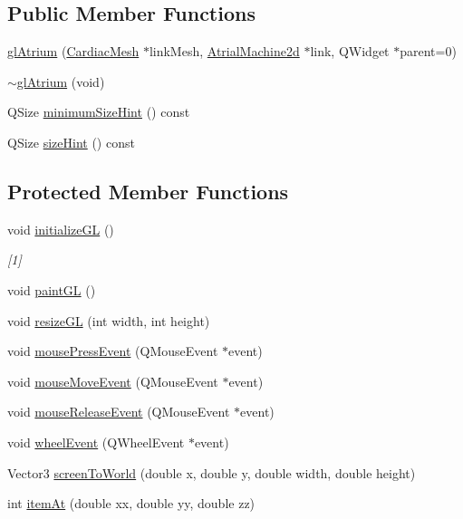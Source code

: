 \subsection*{Public Member Functions}
\begin{DoxyCompactItemize}
\item 
\hyperlink{classgl_atrium_a68d308b0209b6111bbbcbb56b1a5e10c}{gl\+Atrium} (\hyperlink{class_cardiac_mesh}{Cardiac\+Mesh} $\ast$link\+Mesh, \hyperlink{class_atrial_machine2d}{Atrial\+Machine2d} $\ast$link, Q\+Widget $\ast$parent=0)
\item 
\hyperlink{classgl_atrium_aab01fe62e0f7734e3b91b42a11d32db7}{$\sim$gl\+Atrium} (void)
\item 
Q\+Size \hyperlink{classgl_atrium_acf3a401dfd3ca09d8dcb36886f306ba9}{minimum\+Size\+Hint} () const 
\item 
Q\+Size \hyperlink{classgl_atrium_a0e7fc813e7c9ae4d47317109815b9705}{size\+Hint} () const 
\end{DoxyCompactItemize}
\subsection*{Protected Member Functions}
\begin{DoxyCompactItemize}
\item 
void \hyperlink{classgl_atrium_a6fc7ea9064a492b562c0858eb3c44f86}{initialize\+G\+L} ()
\begin{DoxyCompactList}\small\item\em \mbox{[}1\mbox{]} \end{DoxyCompactList}\item 
void \hyperlink{classgl_atrium_a951d4caaef073f6762ddd47a409d2cf6}{paint\+G\+L} ()
\item 
void \hyperlink{classgl_atrium_a40cd7c018c743e5738560fdb4e4fea59}{resize\+G\+L} (int width, int height)
\item 
void \hyperlink{classgl_atrium_af0e47f4d5e0bc6d8cdcf16dd23c0487b}{mouse\+Press\+Event} (Q\+Mouse\+Event $\ast$event)
\item 
void \hyperlink{classgl_atrium_ad5af63d41d959d40d475d8e1aa0f6e9e}{mouse\+Move\+Event} (Q\+Mouse\+Event $\ast$event)
\item 
void \hyperlink{classgl_atrium_a3b2fff6d451823faa28b1b5f09aa384d}{mouse\+Release\+Event} (Q\+Mouse\+Event $\ast$event)
\item 
void \hyperlink{classgl_atrium_a5a4eb4614e6619d55a484cdfb733b2ea}{wheel\+Event} (Q\+Wheel\+Event $\ast$event)
\item 
Vector3 \hyperlink{classgl_atrium_a939d7c7a5289deeeea1763544e5be6b5}{screen\+To\+World} (double x, double y, double width, double height)
\item 
int \hyperlink{classgl_atrium_a02590feb7cd82c82cc67d0697136baf4}{item\+At} (double xx, double yy, double zz)
\end{DoxyCompactItemize}


